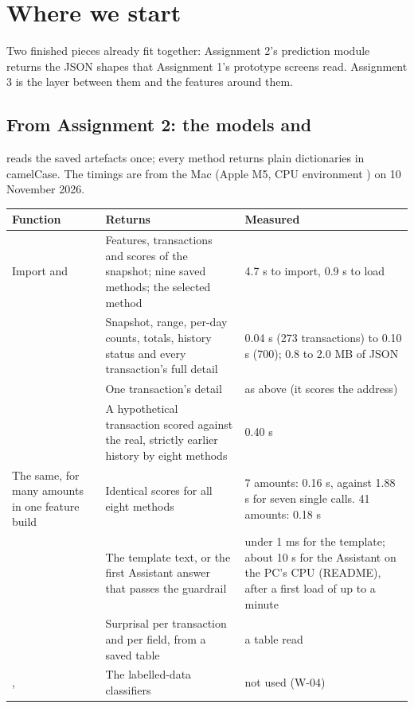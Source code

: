 \section{Where we start}
\label{sec:start}

Two finished pieces already fit together: Assignment 2's prediction module returns the JSON shapes
that Assignment 1's prototype screens read. Assignment 3 is the layer between them and the features
around them.

\subsection{From Assignment 2: the models and }
\label{sec:inherited}

 reads the saved artefacts once; every method returns plain dictionaries in
camelCase. The timings are from the Mac (Apple M5, CPU environment ) on
10 November 2026.

{\small
\begin{longtable}{@{}L{4.9cm}L{5.8cm}L{3.3cm}@{}}
\toprule
\textbf{Function} & \textbf{Returns} & \textbf{Measured} \\
\midrule
\endhead
Import and  & Features, transactions and scores of the snapshot; nine saved methods; the selected method & 4.7 s to import, 0.9 s to load \\
 & Snapshot, range, per-day counts, totals, history status and every transaction's full detail & 0.04 s (273 transactions) to 0.10 s (700); 0.8 to 2.0 MB of JSON \\
 & One transaction's detail & as above (it scores the address) \\
 & A hypothetical transaction scored against the real, strictly earlier history by eight methods & 0.40 s \\
The same, for many amounts in one feature build & Identical scores for all eight methods & 7 amounts: 0.16 s, against 1.88 s for seven single calls. 41 amounts: 0.18 s \\
 & The template text, or the first Assistant answer that passes the guardrail & under 1 ms for the template; about 10 s for the Assistant on the PC's CPU (README), after a first load of up to a minute \\
 & Surprisal per transaction and per field, from a saved table & a table read \\
,  & The labelled-data classifiers & not used (W-04) \\
\bottomrule
\end{longtable}
}

